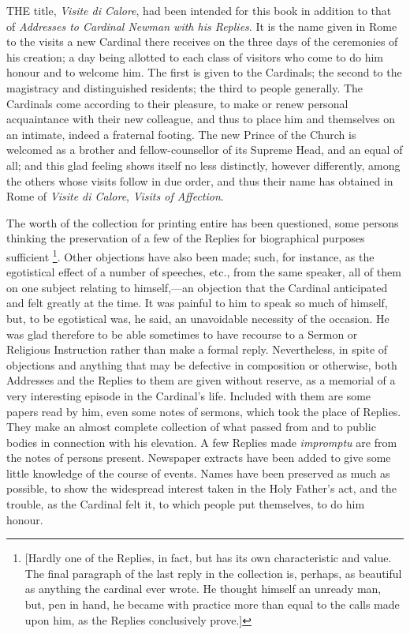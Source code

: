 THE title, \emph{Visite di Calore}, had
been intended for this book in addition to that of \emph{Addresses to
Cardinal Newman with his Replies}. It is the name given in Rome to
the visits a new Cardinal there receives on the three days of the
ceremonies of his creation; a day being allotted to each class of
visitors who come to do him honour and to welcome him. The first is
given to the Cardinals; the second to the magistracy and distinguished
residents; the third to people generally. The Cardinals come according
to their pleasure, to make or renew personal acquaintance with their
new colleague, and thus to place him and themselves on an intimate,
indeed a fraternal footing. The new Prince of the Church is welcomed
as a brother and fellow-counsellor of its Supreme Head, and an equal
of all; and this glad feeling shows itself no less distinctly, however
differently, among the others whose visits follow in due order, and
thus their name has obtained in Rome of \emph{Visite di Calore}, \emph{Visits
of Affection}.

The worth of the collection for printing entire has been
questioned, some persons thinking the preservation of a few of the
Replies for biographical purposes sufficient \footnote{[Hardly one of the Replies, in fact, but has its own
characteristic and value. The final paragraph of the last reply in the
collection is, perhaps, as beautiful as anything the cardinal ever
wrote. He thought himself an unready man, but, pen in hand, he became
with practice more than equal to the calls made upon him, as the
Replies conclusively prove.]}. Other objections have also been made; such, for instance, as
the egotistical effect of a number of speeches, etc., from the same
speaker, all of them on one subject relating to himself,—an
objection that the Cardinal anticipated and felt greatly at the time.
It was painful to him to speak so much of himself, but, to be
egotistical was, he said, an unavoidable necessity of the occasion. He
was glad therefore to be able sometimes to have recourse to a Sermon
or Religious Instruction rather than make a formal reply.
Nevertheless, in spite of objections and anything that may be
defective in composition or otherwise, both Addresses and the Replies
to them are given without reserve, as a memorial of a very interesting
episode in the Cardinal's life. Included with them are some papers
read by him, even some notes of sermons, which took the place of
Replies. They make an almost complete collection of what passed from
and to public bodies in connection with his elevation. A few Replies
made \emph{impromptu} are from the notes of persons present. Newspaper
extracts have been added to give some little knowledge of the
course of events. Names have been preserved as much as possible, to
show the widespread interest taken in the Holy Father's act, and the
trouble, as the Cardinal felt it, to which people put themselves, to
do him honour.

